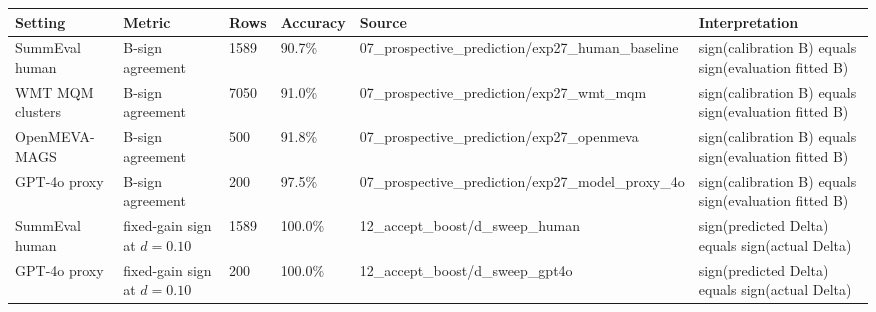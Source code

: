 \begin{tabular}{llllll}
\toprule
Setting & Metric & Rows & Accuracy & Source & Interpretation \\
\midrule
SummEval human & B-sign agreement & 1589 & 90.7\% & 07\_prospective\_prediction/exp27\_human\_baseline & sign(calibration B) equals sign(evaluation fitted B) \\
WMT MQM clusters & B-sign agreement & 7050 & 91.0\% & 07\_prospective\_prediction/exp27\_wmt\_mqm & sign(calibration B) equals sign(evaluation fitted B) \\
OpenMEVA-MAGS & B-sign agreement & 500 & 91.8\% & 07\_prospective\_prediction/exp27\_openmeva & sign(calibration B) equals sign(evaluation fitted B) \\
GPT-4o proxy & B-sign agreement & 200 & 97.5\% & 07\_prospective\_prediction/exp27\_model\_proxy\_4o & sign(calibration B) equals sign(evaluation fitted B) \\
SummEval human & fixed-gain sign at $d=0.10$ & 1589 & 100.0\% & 12\_accept\_boost/d\_sweep\_human & sign(predicted Delta) equals sign(actual Delta) \\
GPT-4o proxy & fixed-gain sign at $d=0.10$ & 200 & 100.0\% & 12\_accept\_boost/d\_sweep\_gpt4o & sign(predicted Delta) equals sign(actual Delta) \\
\bottomrule
\end{tabular}
